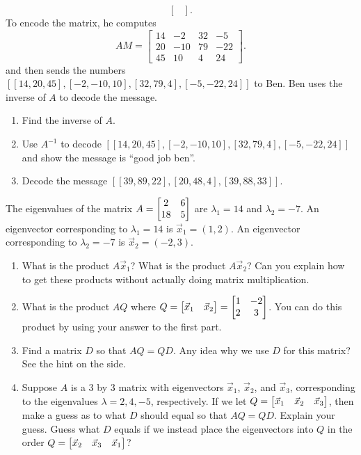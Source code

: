 \begin{problem}[Encryption]
$$\begin{bmatrix}
\end{bmatrix}
.$$
To encode the matrix, he computes 
$$AM = 
\begin{bmatrix}
14 & -2 & 32 & -5 \\
20 & -10 & 79 & -22 \\
45 & 10 & 4 & 24
\end{bmatrix}.$$
and then sends the numbers 
$[
[ 14,  20,  45],
[ -2, -10,  10],
[ 32,  79,   4],
[ -5, -22,  24]]
$ to Ben. Ben uses the inverse of $A$ to decode the message. 
\begin{enumerate}
 \item Find the inverse of $A$. 
 \item Use $A^{-1}$ to decode $[
[ 14,  20,  45],
[ -2, -10,  10],
[ 32,  79,   4],
[ -5, -22,  24]]$ and show the message is ``good job ben''.
 \item Decode the message $[[39, 89, 22],[20, 48,  4],[39, 88, 33]]$.
\end{enumerate}
\end{problem}




\begin{problem}
The eigenvalues of the matrix 
$A=\begin{bmatrix} 2&6\\18&5 \end{bmatrix}$ are $\lambda_1 = 14$ and $\lambda_2 = -7$.  An eigenvector corresponding to $\lambda_1 =14$ is  $\vec x_1=(1,2)$. 
An eigenvector corresponding to $\lambda_2 = -7$ is $\vec x_2 = (-2,3)$. 
\begin{enumerate}
 \item What is the product $A\vec x_1$? What is the product $A\vec x_2$? Can you explain how to get these products without actually doing matrix multiplication.
 \item 
{}%
What is the product $AQ$ where $Q = \begin{bmatrix} \vec x_1&\vec x_2 \end{bmatrix} = \begin{bmatrix} 1&-2\\2&3 \end{bmatrix}$. You can do this product by using your answer to the first part. 
 \item 
{}%
Find a matrix $D$ so that $AQ=QD$.  Any idea why we use $D$ for this matrix? See the hint on the side. 

\item 
Suppose $A$ is a 3 by 3 matrix with eigenvectors $\vec x_1$, $\vec x_2$, and $\vec x_3$, corresponding to the eigenvalues $\lambda = 2,4,-5$, respectively. If we let $Q = \begin{bmatrix} \vec x_1&\vec x_2&\vec x_3 \end{bmatrix}$, then make a guess as to what $D$ should equal so that $AQ=QD$. Explain your guess. Guess what $D$ equals if we instead place the eigenvectors into $Q$ in the order $Q = \begin{bmatrix} \vec x_2&\vec x_3&\vec x_1 \end{bmatrix}$? 


\end{enumerate}
\end{problem}

